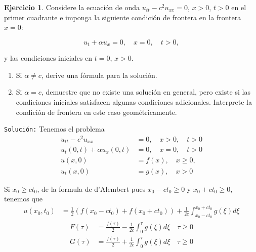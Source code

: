 \documentclass{article}
\theoremstyle{plain}
\theoremstyle{definition}
\newtheorem{ex}[proposición]{Ejercicio}
\begin{document}
\newpage
\begin{ex}
Considere la ecuación de onda \( u_{tt} - c^2 u_{xx} = 0 \), \( x > 0 \), \( t > 0 \) en el primer cuadrante e imponga la siguiente condición de frontera en la frontera \( x = 0 \):

\[
u_t + \alpha u_x = 0, \quad x = 0, \quad t > 0,
\]

y las condiciones iniciales en \( t = 0 \), \( x > 0 \).

\begin{enumerate}
    \item Si \( \alpha \neq c \), derive una fórmula para la solución.
    \item Si \( \alpha = c \), demuestre que no existe una solución en general, pero existe si las condiciones iniciales satisfacen algunas condiciones adicionales. Interprete la condición de frontera en este caso geométricamente.
\end{enumerate}
\texttt{Solución:}
Tenemos el problema
\begin{align*}
    u_{tt} - c^2 u_{xx} &= 0, \quad x > 0, \quad t > 0\\
    u_t(0,t) + \alpha u_x(0,t) &= 0, \quad x = 0, \quad t > 0\\
    u(x, 0) &= f(x), \quad x \geq 0,\\
    u_t(x, 0) &= g(x), \quad x > 0
\end{align*}

Si \(x_0 \geq ct_0\), de la formula de d'Alembert pues $x_0 - ct_0 \geq 0$ y $x_0 + ct_0 \geq 0$, tenemos que
\begin{align*}
    u(x_0,t_0) &= \frac{1}{2} \left( f(x_0 - ct_0) + f(x_0 + ct_0) \right) + \frac{1}{2c} \int_{x_0 - ct_0}^{x_0 + ct_0} g(\xi) d\xi
\end{align*}
\begin{align*}
    F(\tau) &= \frac{f(\tau)}{2} - \frac{1}{2c} \int_{0}^{\tau} g(\xi) d\xi \quad \tau \geq 0\\
    G(\tau) &= \frac{f(\tau)}{2} + \frac{1}{2c} \int_{0}^{\tau} g(\xi) d\xi \quad \tau \geq 0
\end{align*}


\end{ex}
\end{document}
